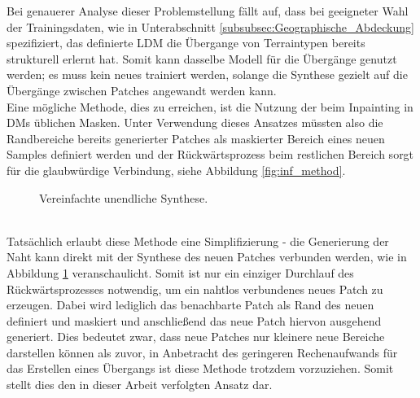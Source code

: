 Bei genauerer Analyse dieser Problemstellung fällt auf, dass bei geeigneter Wahl der Trainingsdaten, wie in Unterabschnitt \ref{subsubsec:Geographische_Abdeckung} spezifiziert, das definierte \ac{LDM} die Übergange von Terraintypen bereits strukturell erlernt hat. Somit kann dasselbe Modell für die Übergänge genutzt werden; es muss kein neues trainiert werden, solange die Synthese gezielt auf die Übergänge zwischen Patches angewandt werden kann. \\
Eine mögliche Methode, dies zu erreichen, ist die Nutzung der beim Inpainting in \ac{DM}s üblichen Masken. Unter Verwendung dieses Ansatzes müssten also die Randbereiche bereits generierter Patches als maskierter Bereich eines neuen Samples definiert werden und der Rückwärtsprozess beim restlichen Bereich sorgt für die glaubwürdige Verbindung, siehe Abbildung \ref{fig:inf_method}.
\begin{figure}[htbp]
    \centering
    \caption{Vereinfachte unendliche Synthese.}
    \label{fig:inf_smart}
\end{figure} \\
Tatsächlich erlaubt diese Methode eine Simplifizierung - die Generierung der Naht kann direkt mit der Synthese des neuen Patches verbunden werden, wie in Abbildung \ref{fig:inf_smart} veranschaulicht. Somit ist nur ein einziger Durchlauf des Rückwärtsprozesses notwendig, um ein nahtlos verbundenes neues Patch zu erzeugen. Dabei wird lediglich das benachbarte Patch als Rand des neuen definiert und maskiert und anschließend das neue Patch hiervon ausgehend generiert. Dies bedeutet zwar, dass neue Patches nur kleinere neue Bereiche darstellen können als zuvor, in Anbetracht des geringeren Rechenaufwands für das Erstellen eines Übergangs ist diese Methode trotzdem vorzuziehen. Somit stellt dies den in dieser Arbeit verfolgten Ansatz dar.

